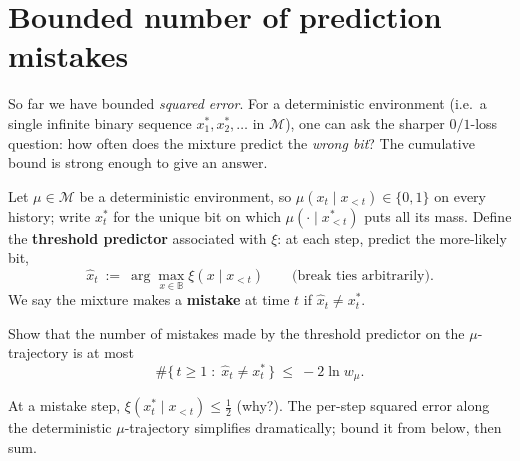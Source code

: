 \documentclass[fontsize=11pt, parskip=half]{scrartcl}
\newcommand{\Mc}{\mathcal{M}}
\begin{document}


\section{Bounded number of prediction mistakes}\label{prob:mistakes}

So far we have bounded \emph{squared error}. For a deterministic environment
(i.e.\ a single infinite binary sequence $x_1^*, x_2^*, \dots$ in $\Mc$),
one can ask the sharper $0/1$-loss question: how often does the mixture predict
the \emph{wrong bit}? The cumulative bound is strong enough to give an answer.


Let $\mu \in \Mc$ be a deterministic environment, so $\mu(x_t \mid x_{<t}) \in
\{0,1\}$ on every history; write $x_t^*$ for the unique bit on which
$\mu(\cdot \mid x^*_{<t})$ puts all its mass. Define the \textbf{threshold
predictor} associated with $\xi$: at each step, predict the more-likely bit,
\[
  \hat{x}_t ~:=~ \arg\max_{x \in \mathbb{B}} \xi(x \mid x_{<t})
  \qquad \text{(break ties arbitrarily).}
\]
We say the mixture makes a \textbf{mistake} at time $t$ if $\hat{x}_t \neq x_t^*$.

\begin{exercise}
\label{prob:mistakes_ex}



Show that the number of mistakes made by the threshold predictor on the
$\mu$-trajectory is at most
\[
  \#\{\, t \geq 1 \;:\; \hat{x}_t \neq x_t^* \,\}
  ~\leq~ -2 \ln w_\mu.
\]

\begin{hint}
At a mistake step, $\xi(x_t^* \mid x_{<t}) \leq \tfrac12$ (why?).
The per-step squared error along the deterministic $\mu$-trajectory
simplifies dramatically; bound it from below, then sum.
\end{hint}
\end{exercise}
\end{document}
